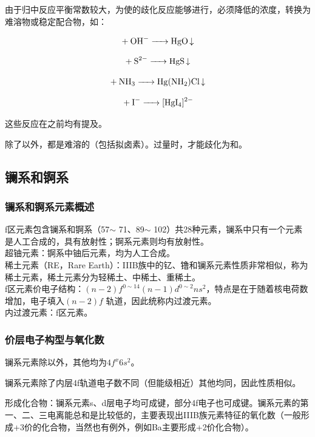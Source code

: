 \documentclass[a4paper,UTF8]{article}
\begin{document}
由于归中反应平衡常数较大，为使的歧化反应能够进行，必须降低的浓度，转换为难溶物或稳定配合物，如：

$$ \ce{+ OH- -> HgO\ce{v}} $$

$$ \ce{+ S^{2-} -> HgS\ce{v}} $$

$$ \ce{+ NH3 -> Hg(NH2)Cl\ce{v}} $$

$$ \ce{+ I- -> [HgI4]^{2-}} $$

这些反应在之前均有提及。

除了以外，都是难溶的（包括拟卤素）。过量时，才能歧化为和。

\subsection{镧系和锕系}

\subsubsection{镧系和锕系元素概述}

f区元素包含镧系和锕系（57$\sim$ 71、89$\sim$ 102）共28种元素，镧系中只有一个元素是人工合成的，具有放射性；锕系元素则均有放射性。\\

超铀元素：锕系中铀后元素，均为人工合成。\\

稀土元素（RE，Rare Earth）：IIIB族中的钇、镥和镧系元素性质非常相似，称为稀土元素，稀土元素分为轻稀土、中稀土、重稀土。\\

f区元素价电子结构：$ (n-2)f^{0\sim 14} (n-1)d^{0\sim 2} ns^2 $，特点是在于随着核电荷数增加，电子填入$ (n-2)f $ 轨道，因此统称内过渡元素。\\

内过渡元素：f区元素。\\

\subsubsection{价层电子构型与氧化数}

镧系元素除以外，其他均为$ 4f^x6s^2 $。

镧系元素除了内层4f轨道电子数不同（但能级相近）其他均同，因此性质相似。

形成化合物：镧系元素s、d层电子均可成键，部分4f电子也可成键。镧系元素的第一、二、三电离能总和是比较低的，主要表现出IIIB族元素特征的氧化数（一般形成+3价的化合物，当然也有例外，例如Ba主要形成+2价化合物）。
\end{document}
